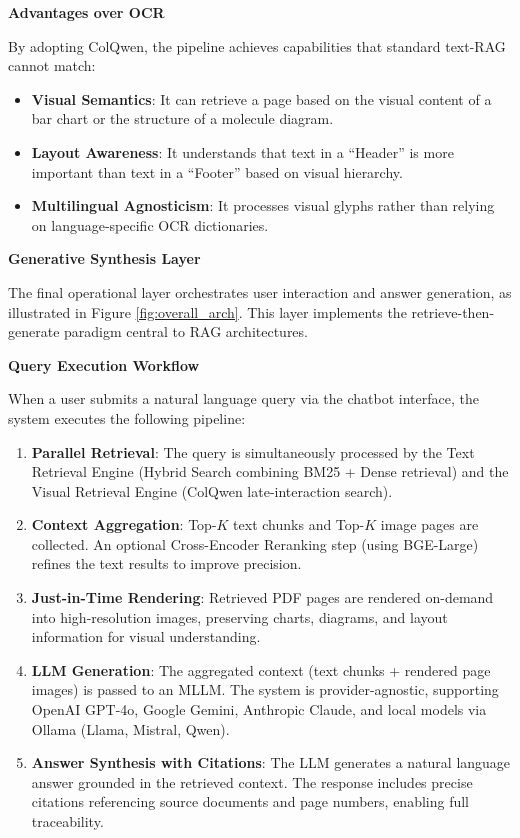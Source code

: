 \textbf{Advantages over OCR}

By adopting ColQwen, the pipeline achieves capabilities that standard text-RAG cannot match:
\begin{itemize}
    \item \textbf{Visual Semantics}: It can retrieve a page based on the visual content of a bar chart or the structure of a molecule diagram.
    \item \textbf{Layout Awareness}: It understands that text in a ``Header'' is more important than text in a ``Footer'' based on visual hierarchy.
    \item \textbf{Multilingual Agnosticism}: It processes visual glyphs rather than relying on language-specific OCR dictionaries.
\end{itemize}

\textbf{Generative Synthesis Layer}

The final operational layer orchestrates user interaction and answer generation, as illustrated in Figure \ref{fig:overall_arch}. This layer implements the retrieve-then-generate paradigm central to RAG architectures.

\textbf{Query Execution Workflow}

When a user submits a natural language query via the chatbot interface, the system executes the following pipeline:

\begin{enumerate}
    \item \textbf{Parallel Retrieval}: The query is simultaneously processed by the Text Retrieval Engine (Hybrid Search combining BM25 + Dense retrieval) and the Visual Retrieval Engine (ColQwen late-interaction search).
    
    \item \textbf{Context Aggregation}: Top-$K$ text chunks and Top-$K$ image pages are collected. An optional Cross-Encoder Reranking step (using BGE-Large) refines the text results to improve precision.
    
    \item \textbf{Just-in-Time Rendering}: Retrieved PDF pages are rendered on-demand into high-resolution images, preserving charts, diagrams, and layout information for visual understanding.
    
    \item \textbf{LLM Generation}: The aggregated context (text chunks + rendered page images) is passed to an MLLM. The system is provider-agnostic, supporting OpenAI GPT-4o, Google Gemini, Anthropic Claude, and local models via Ollama (Llama, Mistral, Qwen).
    
    \item \textbf{Answer Synthesis with Citations}: The LLM generates a natural language answer grounded in the retrieved context. The response includes precise citations referencing source documents and page numbers, enabling full traceability.
\end{enumerate}

